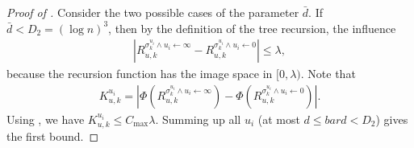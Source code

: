 \documentclass[11pt]{amsart}
\newcommand{\abs}[1]{\ensuremath{\left\vert#1\right\vert}}
\theoremstyle{definition}
\theoremstyle{remark}
\begin{document}
\begin{proof}[Proof of ]
Consider the two possible cases of the parameter $\bar d$. If $\bar d < D_2 = (\log n)^3$, then by the definition of the tree recursion, the influence 
\begin{align*}
\abs{R_{u,k}^{\sigma^{u_i}_k \land u_i \gets \infty} - R_{u,k}^{\sigma^{u_i}_k \land u_i \gets 0}} \leq \lambda,
\end{align*}
because the recursion function has the image space in $[0,\lambda)$. Note that 
\begin{align*}
K_{u,k}^{u_i} = \abs{\Phi(R_{u,k}^{\sigma^{u_i}_k \land u_i \gets \infty}) - \Phi(R_{u,k}^{\sigma^{u_i}_k \land u_i \gets 0})}.
\end{align*}
Using , we have $K_{u,k}^{u_i} \leq C_{\max} \lambda$. Summing up all $u_i$ (at most $d \leq bar d < D_2$) gives the first bound.



\end{proof}
\end{document}
